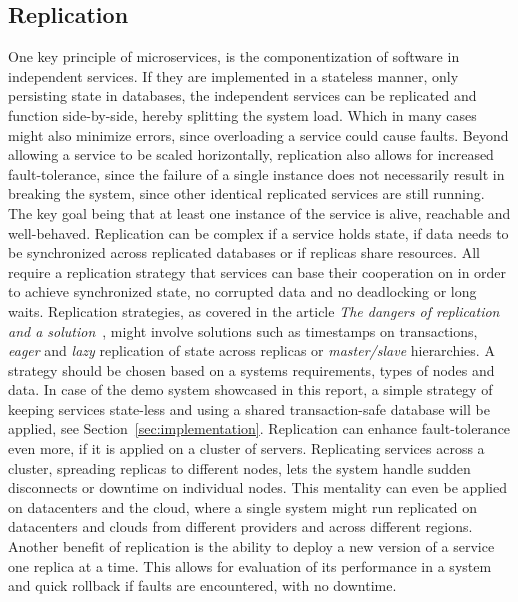 \subsection{Replication}
One key principle of microservices, is the componentization of software in
independent services. If they are implemented in a stateless manner, only
persisting state in databases, the independent services can be replicated and
function side-by-side, hereby splitting the system load. Which in many cases
might also minimize errors, since overloading a service could cause faults.
Beyond allowing a service to be scaled horizontally, replication also allows
for increased fault-tolerance, since the failure of a single instance does not
necessarily result in breaking the system, since other identical replicated
services are still running. The key goal being that at least one instance of the
service is alive, reachable and well-behaved.
\newline\newline
Replication can be complex if a service holds state, if data needs to be
synchronized across replicated databases or if replicas share resources.
All require a replication strategy that services can base their cooperation on
in order to achieve synchronized state, no corrupted data and no deadlocking or
long waits.
Replication strategies, as covered in the article \textit{The dangers of
replication and a solution}~\cite{gray1996dangers}, might involve solutions
such as timestamps on transactions, \textit{eager} and \textit{lazy} replication
of state across replicas or \textit{master/slave} hierarchies. A strategy should
be chosen based on a systems requirements, types of nodes and data.
In case of the demo system showcased in this report, a simple strategy of
keeping services state-less and using a shared transaction-safe database will
be applied, see Section~\ref{sec:implementation}.
\newline\newline
Replication can enhance fault-tolerance even more, if it is applied on a cluster
of servers. Replicating services across a cluster, spreading replicas to
different nodes, lets the system handle sudden disconnects or downtime on
individual nodes. This mentality can even be applied on datacenters and the
cloud, where a single system might run replicated on datacenters and clouds
from different providers and across different regions.
\newline\newline
Another benefit of replication is the ability to deploy a new version of a
service one replica at a time. This allows for evaluation of its performance
in a system and quick rollback if faults are encountered, with no downtime.

